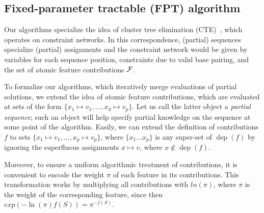 \documentclass[]{bmcart}
\newtheorem{definition}[theorem]{Definition}
\newcommand{\network}{\mathcal{N}}
\newcommand{\dep}{\operatorname{dep}}
\newcommand{\real}{\mathbb{R}}
\newcommand{\F}{\mathcal{F}}
\newcommand{\X}{\mathcal{X}}
\newcommand{\Def}[1]{\emph{#1}}
\newcommand{\citep}[1]{\cite{#1}}
\newcommand{\citet}[1]{\cite{#1}}
\begin{document}
\subsection*{Fixed-parameter tractable (FPT) algorithm}
\label{sec:FPT}



Our algorithms specialize the idea of cluster tree elimination (CTE)~\citep{Dechter2013}, which operates on constraint networks. In this correspondence, (partial) sequences specialize (partial) assignments and the constraint network would be given by variables for each sequence position, constraints due to valid base pairing, and the set of atomic feature contributions $\cal F$.


To formalize our algorithms, which iteratively merge evaluations of partial solutions, we extend the idea of atomic feature contributions, which are evaluated at sets of the form $\{x_1\mapsto v_1, \dots, x_d\mapsto v_p\}$. Let us call the latter object a \Def{partial sequence}; such an object will help specify partial knowledge on the sequence at some point of the algorithm. Easily, we can extend the definition of contributions $f$ to sets $\{x_1\mapsto v_1, \dots, x_p\mapsto v_p\}$, where $\{x_1\dots x_p\}$ is any super-set of $\dep(f)$ by ignoring the superfluous assignments $x\mapsto v$, where $x\not\in\dep(f)$. 

%


Moreover, to ensure a uniform algorithmic treatment of contributions, it is convenient to encode the weight $\pi$ of each feature in its contributions. This transformation works by multiplying all contributions with $ln(\pi)$, where $\pi$ is the weight of the corresponding feature, since then
$exp(-\ln(\pi)f(S))=\pi^{-f(S)}.$
\end{document}
